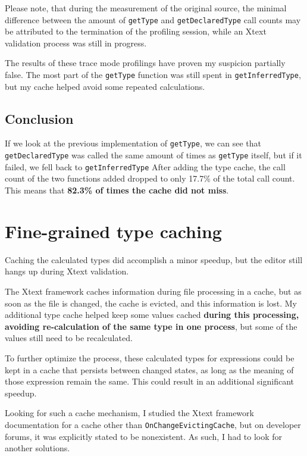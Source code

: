 \documentclass[11pt,a4paper,oneside]{report}
\begin{document}
Please note, that during the measurement of the original source, the minimal
difference between the amount of \texttt{getType} and \texttt{getDeclaredType}
call counts may be attributed to the termination of the profiling session, while
an Xtext validation process was still in progress.

The results of these trace mode profilings have proven my suspicion partially
false. The most part of the \texttt{getType} function was still spent in
\texttt{getInferredType}, but my cache helped avoid some repeated calculations.

\subsection{Conclusion}
If we look at the previous implementation of \texttt{getType}, we can see that
\texttt{getDeclaredType} was called the same amount of times as
\texttt{getType} itself, but if it failed, we fell back to
\texttt{getInferredType} After adding the type cache, the call count of the two
functions added dropped to only 17.7\% of the total call count. This means that
\textbf{82.3\% of times the cache did not miss}.

\pagebreak

\section{Fine-grained type caching}
Caching the calculated types did accomplish a minor speedup, but the editor
still hangs up during Xtext validation.

The Xtext framework caches information during file processing in a cache, but as
soon as the file is changed, the cache is evicted, and this information is lost.
My additional type cache helped keep some values cached \textbf{during this
processing, avoiding re-calculation of the same type in one process}, but some
of the values still need to be recalculated.

To further optimize the process, these calculated types for expressions could
be kept in a cache that persists between changed states, as long as the meaning
of those expression remain the same. This could result in an additional
significant speedup.

Looking for such a cache mechanism, I studied the Xtext framework documentation
for a cache other than \texttt{OnChangeEvictingCache}, but on developer forums,
it was explicitly stated to be nonexistent\cite{xtext-fine-grained-caching}. As
such, I had to look for another solutions.
\end{document}
